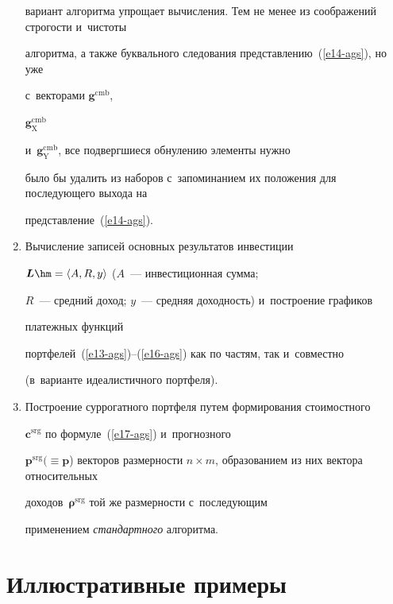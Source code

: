 \begin{multicols}{2}
\begin{enumerate}[1.]
{вариант алгоритма упрощает вычисления. Тем не менее из соображений строгости и~чистоты 


алгоритма, а также буквального следования представлению~(\ref{e14-ags}), но уже 


с~векторами $\boldsymbol{g}^{\mathrm{cmb}}$, 


$\boldsymbol{g}^{\mathrm{cmb}}_{\mathrm{X}}$ 


и~$\boldsymbol{g}_{\mathrm{Y}}^{\mathrm{cmb}}$, все подвергшиеся обнулению элементы нужно 


было бы удалить из наборов с~запоминанием их положения для последующего выхода на 


представление~(\ref{e14-ags}).}


  


  


  \item  Вычисление записей основных результатов инвестиции 


$\boldsymbol{L}\hm= \langle A, R, y\rangle$ ($A$~--- инвестиционная сумма; 


$R$~--- средний доход; $y$~--- средняя доходность) и~построение графиков 


платежных функций 


 портфелей~(\ref{e13-ags})--(\ref{e16-ags}) как по частям, так и~совместно 


(в~варианте идеалистичного портфеля). 


  \item Построение суррогатного портфеля путем формирования стоимостного 


$\boldsymbol{c}^{\mathrm{srg}}$ по формуле~(\ref{e17-ags}) и~прогнозного 


$\boldsymbol{p}^{\mathrm{srg}} (\equiv \boldsymbol{p}$) векторов размерности $n\times 


m$, образованием из них вектора относительных 


доходов~$\boldsymbol{\rho}^{\mathrm{srg}}$ той же размерности с~последующим 


применением \textit{стандартного} алгоритма. 


  \end{enumerate}


  


  \section{Иллюстративные примеры}



\end{multicols}
